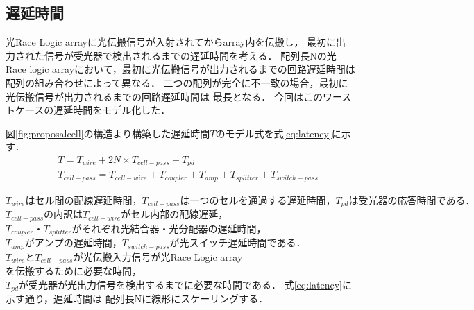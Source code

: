 \subsection{遅延時間}
光Race Logic arrayに光伝搬信号が入射されてからarray内を伝搬し，
最初に出力された信号が受光器で検出されるまでの遅延時間を考える．
配列長Nの光Race logic arrayにおいて，最初に光伝搬信号が出力されるまでの回路遅延時間は
配列の組み合わせによって異なる．
二つの配列が完全に不一致の場合，最初に光伝搬信号が出力されるまでの回路遅延時間は
最長となる．
今回はこのワーストケースの遅延時間をモデル化した．

図\ref{fig:proposalcell}の構造より構築した遅延時間$T$のモデル式を式\ref{eq:latency}に示す．
\begin{eqnarray}
&&T = T_{wire}+2N \times T_{cell-pass}+T_{pd} \nonumber \\
&&T_{cell-pass} = T_{cell-wire}+T_{coupler}+T_{amp}+T_{splitter}+T_{switch-pass}
\label{eq:latency}
\end{eqnarray}

$T_{wire}はセル間の配線遅延時間，T_{cell-pass}は一つのセルを通過する遅延時間，T_{pd}は受光器の応答時間である．$
$T_{cell-pass}の内訳はT_{cell-wire}がセル内部の配線遅延，$
$T_{coupler}・T_{splitter}がそれぞれ光結合器・光分配器の遅延時間，$
$T_{amp}がアンプの遅延時間，T_{switch-pass}が光スイッチ遅延時間である．$
$T_{wire}とT_{cell-pass}が光伝搬入力信号が$光Race Logic array$を伝搬するために必要な時間，$
$T_{pd}が受光器が光出力信号を検出するまでに必要な時間である．$
式\ref{eq:latency}に示す通り，遅延時間は
配列長Nに線形にスケーリングする．

